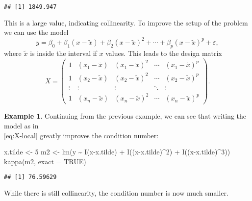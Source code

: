 \documentclass[
  a4paper,
]{article}
\newenvironment{Shaded}{\begin{snugshade}}{\end{snugshade}}
\newcommand{\AttributeTok}[1]{\textcolor[rgb]{0.77,0.63,0.00}{#1}}
\newcommand{\ConstantTok}[1]{\textcolor[rgb]{0.00,0.00,0.00}{#1}}
\newcommand{\DecValTok}[1]{\textcolor[rgb]{0.00,0.00,0.81}{#1}}
\newcommand{\FunctionTok}[1]{\textcolor[rgb]{0.00,0.00,0.00}{#1}}
\newcommand{\NormalTok}[1]{#1}
\newcommand{\OtherTok}[1]{\textcolor[rgb]{0.56,0.35,0.01}{#1}}
\newcommand{\SpecialCharTok}[1]{\textcolor[rgb]{0.00,0.00,0.00}{#1}}
\theoremstyle{definition}
\theoremstyle{definition}
\newtheorem{example}{Example}[section]
\theoremstyle{definition}
\theoremstyle{definition}
\theoremstyle{remark}
\begin{document}
\begin{verbatim}
## [1] 1849.947
\end{verbatim}

This is a large value, indicating collinearity. To improve the setup
of the problem we can use the model
\begin{equation*}
  y
  = \beta_0 + \beta_1 (x - \tilde x) + \beta_2 (x - \tilde x)^2 + \cdots + \beta_p (x - \tilde x)^p + \varepsilon,
\end{equation*}
where \(\tilde x\) is inside the interval if \(x\) values.
This leads to the design matrix
\begin{equation}
  X
  = \begin{pmatrix}
      1 & (x_1-\tilde x) & (x_1-\tilde x)^2 & \cdots & (x_1-\tilde x)^p \\
      1 & (x_2-\tilde x) & (x_2-\tilde x)^2 & \cdots & (x_2-\tilde x)^p \\
      \vdots & \vdots & \vdots & \ddots & \vdots \\
      1 & (x_n-\tilde x) & (x_n-\tilde x)^2 & \cdots & (x_n-\tilde x)^p
    \end{pmatrix}.  \label{eq:X-local}
\end{equation}

\begin{example}
Continuing from the previous example, we can see that writing the model as in\\
\eqref{eq:X-local} greatly improves the condition number:

\begin{Shaded}
\begin{Highlighting}[]
\NormalTok{x.tilde }\OtherTok{\textless{}{-}} \DecValTok{5}
\NormalTok{m2 }\OtherTok{\textless{}{-}} \FunctionTok{lm}\NormalTok{(y }\SpecialCharTok{\textasciitilde{}} \FunctionTok{I}\NormalTok{(x}\SpecialCharTok{{-}}\NormalTok{x.tilde) }\SpecialCharTok{+} \FunctionTok{I}\NormalTok{((x}\SpecialCharTok{{-}}\NormalTok{x.tilde)}\SpecialCharTok{\^{}}\DecValTok{2}\NormalTok{) }\SpecialCharTok{+} \FunctionTok{I}\NormalTok{((x}\SpecialCharTok{{-}}\NormalTok{x.tilde)}\SpecialCharTok{\^{}}\DecValTok{3}\NormalTok{))}
\FunctionTok{kappa}\NormalTok{(m2, }\AttributeTok{exact =} \ConstantTok{TRUE}\NormalTok{)}
\end{Highlighting}
\end{Shaded}

\begin{verbatim}
## [1] 76.59629
\end{verbatim}

While there is still collinearity, the condition number is now much smaller.
\end{example}
\end{document}
